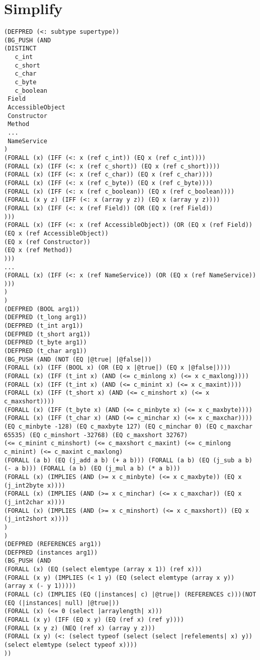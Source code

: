 \section{Simplify}
\begin{verbatim}
(DEFPRED (<: subtype supertype))
(BG_PUSH (AND
(DISTINCT 
   c_int
   c_short
   c_char
   c_byte
   c_boolean
 Field
 AccessibleObject
 Constructor
 Method
 ...
 NameService
)
(FORALL (x) (IFF (<: x (ref c_int)) (EQ x (ref c_int))))
(FORALL (x) (IFF (<: x (ref c_short)) (EQ x (ref c_short))))
(FORALL (x) (IFF (<: x (ref c_char)) (EQ x (ref c_char))))
(FORALL (x) (IFF (<: x (ref c_byte)) (EQ x (ref c_byte))))
(FORALL (x) (IFF (<: x (ref c_boolean)) (EQ x (ref c_boolean))))
(FORALL (x y z) (IFF (<: x (array y z)) (EQ x (array y z))))
(FORALL (x) (IFF (<: x (ref Field)) (OR (EQ x (ref Field))
)))
(FORALL (x) (IFF (<: x (ref AccessibleObject)) (OR (EQ x (ref Field))
(EQ x (ref AccessibleObject))
(EQ x (ref Constructor))
(EQ x (ref Method))
)))
...
(FORALL (x) (IFF (<: x (ref NameService)) (OR (EQ x (ref NameService))
)))
)
)
(DEFPRED (BOOL arg1))
(DEFPRED (t_long arg1))
(DEFPRED (t_int arg1))
(DEFPRED (t_short arg1))
(DEFPRED (t_byte arg1))
(DEFPRED (t_char arg1))
(BG_PUSH (AND (NOT (EQ |@true| |@false|))
(FORALL (x) (IFF (BOOL x) (OR (EQ x |@true|) (EQ x |@false|))))
(FORALL (x) (IFF (t_int x) (AND (<= c_minlong x) (<= x c_maxlong))))
(FORALL (x) (IFF (t_int x) (AND (<= c_minint x) (<= x c_maxint))))
(FORALL (x) (IFF (t_short x) (AND (<= c_minshort x) (<= x c_maxshort))))
(FORALL (x) (IFF (t_byte x) (AND (<= c_minbyte x) (<= x c_maxbyte))))
(FORALL (x) (IFF (t_char x) (AND (<= c_minchar x) (<= x c_maxchar))))
(EQ c_minbyte -128) (EQ c_maxbyte 127) (EQ c_minchar 0) (EQ c_maxchar 65535) (EQ c_minshort -32768) (EQ c_maxshort 32767)
(<= c_minint c_minshort) (<= c_maxshort c_maxint) (<= c_minlong c_minint) (<= c_maxint c_maxlong)
(FORALL (a b) (EQ (j_add a b) (+ a b))) (FORALL (a b) (EQ (j_sub a b) (- a b))) (FORALL (a b) (EQ (j_mul a b) (* a b)))
(FORALL (x) (IMPLIES (AND (>= x c_minbyte) (<= x c_maxbyte)) (EQ x (j_int2byte x))))
(FORALL (x) (IMPLIES (AND (>= x c_minchar) (<= x c_maxchar)) (EQ x (j_int2char x))))
(FORALL (x) (IMPLIES (AND (>= x c_minshort) (<= x c_maxshort)) (EQ x (j_int2short x))))
)
)
(DEFPRED (REFERENCES arg1))
(DEFPRED (instances arg1))
(BG_PUSH (AND
(FORALL (x) (EQ (select elemtype (array x 1)) (ref x)))
(FORALL (x y) (IMPLIES (< 1 y) (EQ (select elemtype (array x y)) (array x (- y 1)))))
(FORALL (c) (IMPLIES (EQ (|instances| c) |@true|) (REFERENCES c)))(NOT (EQ (|instances| null) |@true|))
(FORALL (x) (<= 0 (select |arraylength| x)))
(FORALL (x y) (IFF (EQ x y) (EQ (ref x) (ref y))))
(FORALL (x y z) (NEQ (ref x) (array y z)))
(FORALL (x y) (<: (select typeof (select (select |refelements| x) y)) (select elemtype (select typeof x))))
)) 

\end{verbatim}
